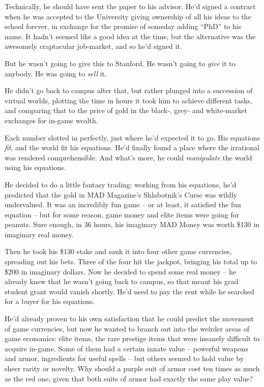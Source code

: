 Technically, he should have sent the paper to his advisor. He'd
signed a contract when he was accepted to the University giving
ownership of all his ideas to the school forever, in exchange for
the promise of someday adding ``PhD'' to his name. It hadn't seemed
like a good idea at the time, but the alternative was the awesomely
craptacular job-market, and so he'd signed it.

But he wasn't going to give this to Stanford. He wasn't going to
\emph{give} it to anybody. He was going to \emph{sell} it.

He didn't go back to campus after that, but rather plunged into a
succession of virtual worlds, plotting the time in hours it took
him to achieve different tasks, and comparing that to the price of
gold in the black-, grey- and white-market exchanges for in-game
wealth.

Each number slotted in perfectly, just where he'd expected it to
go. His equations \emph{fit}, and the world fit his equations. He'd
finally found a place where the irrational was rendered
comprehensible. And what's more, he could \emph{manipulate} the
world using his equations.

He decided to do a little fantasy trading: working from his
equations, he'd predicted that the gold in MAD Magazine's
Shlabotnik's Curse was wildly undervalued. It was an incredibly fun
game -- or at least, it satisfied the fun equation -- but for some
reason, game money and elite items were going for peanuts. Sure
enough, in 36 hours, his imaginary MAD Money was worth \$130 in
imaginary real money.

Then he took his \$130 stake and sank it into four other game
currencies, spreading out his bets. Three of the four hit the
jackpot, bringing his total up to \$200 in imaginary dollars. Now
he decided to spend some real money -- he already knew that he
wasn't going back to campus, so that meant his grad student grant
would vanish shortly. He'd need to pay the rent while he searched
for a buyer for his equations.

He'd already proven to his own satisfaction that he could predict
the movement of game currencies, but now he wanted to branch out
into the weirder areas of game economics: elite items, the rare
prestige items that were insanely difficult to acquire in-game.
Some of them had a certain innate value -- powerful weapons and
armor, ingredients for useful spells -- but others seemed to hold
value by sheer rarity or novelty. Why should a purple suit of armor
cost ten times as much as the red one, given that both suits of
armor had exactly the same play value?

